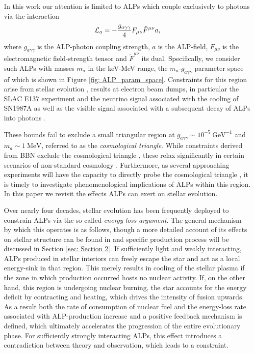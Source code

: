 In this work our attention is limited to ALPs which couple exclusively to photons via the interaction
\begin{equation}
    \label{eq: ALP-Photon interaction}
    \mathcal{L}_a=-\frac{g_{a\gamma\gamma}}{4}F_{\mu\nu}\Tilde{F}^{\mu\nu}a,
\end{equation}
where $g_{a\gamma\gamma}$ is the ALP-photon coupling strength, $a$ is the ALP-field, $F_{\mu\nu}$ is the electromagnetic field-strength tensor and $\tilde{F}^{\mu\nu}$ its dual. Specifically, we consider such ALPs with masses $m_a$ in the keV-MeV range, the $m_a$-$g_{a\gamma\gamma}$ parameter space of which is shown in Figure \ref{fig: ALP_param_space}. Constraints for this region arise from stellar evolution \cite{Carenza:2020zil}, results at electron beam dumps, in particular the SLAC E137 experiment \cite{Bjorken87, Dolan:2017osp} and the neutrino signal associated with the cooling of SN1987A \cite{Lucente:2020whw} as well as the visible signal associated with a subsequent decay of ALPs into photons \cite{Jaeckel:2017tud}.




These bounds fail to exclude a small triangular region at $g_{a\gamma\gamma}\sim10^{-5}\ \mathrm{GeV}^{-1}$ and $m_a\sim1\ \mathrm{MeV}$, referred to as the \textit{cosmological triangle}. While constraints derived from BBN exclude the cosmological triangle \cite{Cadamuro:2011fd, Updated_BBN}, these relax significantly in certain scenarios of non-standard cosmology \cite{Dolan:2017osp, Depta:2020wmr}. Furthermore, as several approaching experiments will have the capacity to directly probe the cosmological triangle \cite{Dolan:2017osp, Brdar:2020dpr}, it is timely to investigate  phenomenological implications of ALPs within this region. In this paper we revisit the effects ALPs can exert on stellar evolution.







Over nearly four decades, stellar evolution has been frequently deployed to constrain ALPs via the so-called \textit{energy-loss argument}. The general mechanism by which this operates is as follows, though a more detailed account of its effects on stellar structure can be found in \cite{Raffelt:1996wa} and specific production process will be discussed in Section \ref{sec: Section 2}. If sufficiently light and weakly interacting, ALPs produced in stellar interiors can freely escape the star and act as a local energy-sink in that region. This merely results in cooling of the stellar plasma if the zone in which production occurred hosts no nuclear activity. If, on the other hand, this region is undergoing nuclear burning, the star accounts for the energy deficit by contracting and heating, which drives the intensity of fusion upwards. As a result both the rate of consumption of nuclear fuel and the energy-loss rate associated with ALP-production increase and a positive feedback mechanism is defined, which ultimately accelerates the progression of the entire evolutionary phase. For sufficiently strongly interacting ALPs, this effect introduces a contradiction between theory and observation, which leads to a constraint.




